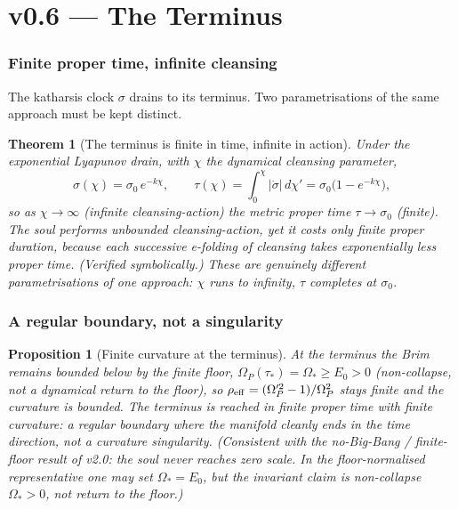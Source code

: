 \documentclass[11pt,a4paper]{article}
\theoremstyle{plain}
\newtheorem{proposition}{Proposition}
\newtheorem{theorem}{Theorem}
\theoremstyle{definition}
\theoremstyle{remark}
\begin{document}
\part*{v0.6 --- The Terminus}

\section{Finite proper time, infinite cleansing}

The katharsis clock $\sigma$ drains to its terminus. Two parametrisations of the same approach must be
kept distinct.

\begin{theorem}[The terminus is finite in time, infinite in action]\label{thm:terminus}
Under the exponential Lyapunov drain, with $\chi$ the dynamical cleansing parameter,
\begin{equation}
\sigma(\chi)=\sigma_0\,e^{-k\chi},\qquad
\tau(\chi)=\int_0^\chi\!|\dot\sigma|\,d\chi'=\sigma_0\bigl(1-e^{-k\chi}\bigr),
\end{equation}
so as $\chi\to\infty$ (infinite cleansing-action) the metric proper time $\tau\to\sigma_0$
(\emph{finite}). The soul performs unbounded cleansing-action, yet it costs only finite proper duration,
because each successive e-folding of cleansing takes exponentially less proper time. (Verified
symbolically.) These are genuinely different parametrisations of one approach: $\chi$ runs to infinity,
$\tau$ completes at $\sigma_0$.
\end{theorem}

\section{A regular boundary, not a singularity}

\begin{proposition}[Finite curvature at the terminus]\label{prop:regular}
At the terminus the Brim remains bounded below by the finite floor, $\Omega_P(\tau_*)=\Omega_*\ge E_0>0$
(non-collapse, not a dynamical return to the floor), so $\rho_{\rm eff}=(\Omega_P'^2-1)/\Omega_P^2$
stays finite and the curvature is bounded. The terminus is reached in finite proper time with finite
curvature: a \emph{regular boundary} where the manifold cleanly ends in the time direction, not a
curvature singularity. (Consistent with the no-Big-Bang / finite-floor result of v2.0: the soul never
reaches zero scale. In the floor-normalised representative one may set $\Omega_*=E_0$, but the
invariant claim is non-collapse $\Omega_*>0$, not return to the floor.)
\end{proposition}
\end{document}
